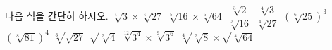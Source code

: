 다음 식을 간단히 하시오.
 $\sqrt[4]{3}\times\sqrt[4]{27}$
 $\sqrt[5]{16}\times\sqrt[5]{64}$
 $\dfrac{\sqrt[3]{2}}{\sqrt[3]{16}}$
 $\dfrac{\sqrt[4]{3}}{\sqrt[4]{27}}$
 $(\sqrt[6]{25})^{3}$
 $(\sqrt[8]{81})^{4}$
 $\sqrt[3]{\sqrt{27}}$
 $\sqrt{\sqrt[3]{4}}$
 $\sqrt[12]{3^4}\times\sqrt[9]{3^6}$
 $\sqrt[4]{\sqrt[3]{8}}\times\sqrt{\sqrt[4]{64}}$
